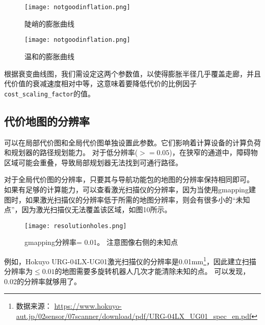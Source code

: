 
\begin{figure}[!htb]
	\begin{minipage}[t]{0.49\linewidth}
		\centering 
		\texttt{[image: notgoodinflation.png]} 
		\caption{陡峭的膨胀曲线} 
		\label{fig:side:a} 
	\end{minipage}%
	\begin{minipage}[t]{0.49\linewidth} 
		\centering 
		\texttt{[image: notgoodinflation.png]} 
		\caption{温和的膨胀曲线} 
		\label{fig:side:b} 
	\end{minipage} 
\end{figure}

根据衰变曲线图，我们需设定这两个参数值，以使得膨胀半径几乎覆盖走廊，并且代价值的衰减速度相对中等，这意味着要降低代价的比例因子\texttt{cost_scaling_factor}的值。

\subsection[costmap resolution]{代价地图的分辨率}%
可以在局部代价图和全局代价图单独设置此参数。它们影响着计算设备的计算负荷和规划器的路径规划能力。
对于低分辨率($>=0.05$)，在狭窄的通道中，障碍物区域可能会重叠，导致局部规划器无法找到可通行路径。

对于全局代价图的分辨率，只要其与导航功能包的地图的分辨率保持相同即可。
如果有足够的计算能力，可以查看激光扫描仪的分辨率，因为当使用gmapping建图时，如果激光扫描仪的分辨率低于所需的地图分辨率，则会有很多小的“未知点”，因为激光扫描仪无法覆盖该区域，如图10所示。


\begin{figure}[!h]
	\begin{center}
		\texttt{[image: resolutionholes.png]}
		\caption{gmapping分辨率= 0.01。 注意图像右侧的未知点}
	\end{center}
\end{figure}

例如，Hokuyo URG-04LX-UG01激光扫描仪的分辨率是0.01mm\footnote{数据来源： \url{https://www.hokuyo-aut.jp/02sensor/07scanner/download/pdf/URG-04LX_UG01_spec_en.pdf}}，因此建立扫描分辨率为$\leq 0.01$的地图需要多旋转机器人几次才能清除未知的点。
可以发现，0.02的分辨率就够用了。

